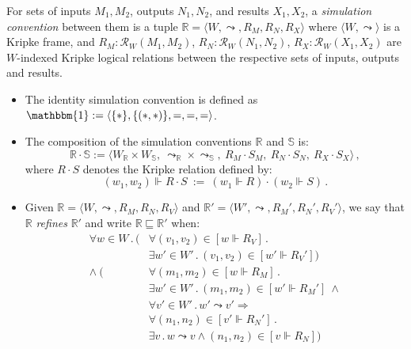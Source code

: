 \begin{definition}
For sets of inputs $M_1, M_2$, outputs $N_1, N_2$, and results $X_1, X_2$,
a \emph{simulation convention} between them
is a tuple $\mathbb{R} = \langle W, \leadsto, R_M, R_N, R_X \rangle$
where $\langle W, \leadsto \rangle$ is a Kripke frame, and
$R_M : \mathcal{R}_W(M_1, M_2)$,
$R_N : \mathcal{R}_W(N_1, N_2)$,
$R_X : \mathcal{R}_W(X_1, X_2)$
are $W$-indexed Kripke logical relations
between the respective sets of inputs, outputs and results.
\begin{itemize}
\item
The identity simulation convention is defined as
$\mathbbm{1} := \langle \{*\}, \{(*,*)\}, {=}, {=}, {=} \rangle$.
\item
The composition of
the simulation conventions $\mathbb{R}$ and $\mathbb{S}$ is:
\[
    \mathbb{R} \cdot \mathbb{S} :=
      \langle
        W_\mathbb{R} \times W_\mathbb{S}, \:
        {\leadsto}_\mathbb{R} \times {\leadsto}_\mathbb{S}, \:
        R_M \cdot S_M, \:
        R_N \cdot S_N, \:
        R_X \cdot S_X
      \rangle \,,
\]
where $R \cdot S$ denotes the Kripke relation defined by:
\[
    (w_1, w_2) \Vdash R \cdot S \: := \:
      (w_1 \Vdash R) \cdot (w_2 \Vdash S) \,.
\]
\item
Given
$\mathbb{R} = \langle W, \leadsto, R_M, R_N, R_V \rangle$ and
$\mathbb{R}' = \langle W', \leadsto, R_M', R_N', R_V' \rangle$,
we say that $\mathbb{R}$ \emph{refines} $\mathbb{R}'$
and write $\mathbb{R} \sqsubseteq \mathbb{R}'$
when:
\begin{align*}
  \forall w \in W \,.\, (
    &\forall (v_1, v_2) \in [w \Vdash R_V] \,.\, \\
    &\exists w' \in W' \,.\, (v_1, v_2) \in [w' \Vdash R_V']) \\
  \wedge \: (
    &\forall (m_1, m_2) \in [w \Vdash R_M] \,.\, \\
    &\exists w' \in W' \,.\, (m_1, m_2) \in [w' \Vdash R_M'] \: \wedge \\
    &\forall v' \in W' \,.\, w' \leadsto v' \Rightarrow \\
    &\forall (n_1, n_2) \in [v' \Vdash R_N'] \,.\, \\
    &\exists v \,.\, w \leadsto v \wedge (n_1, n_2) \in [v \Vdash R_N] )
\end{align*}
\end{itemize}
\end{definition}

